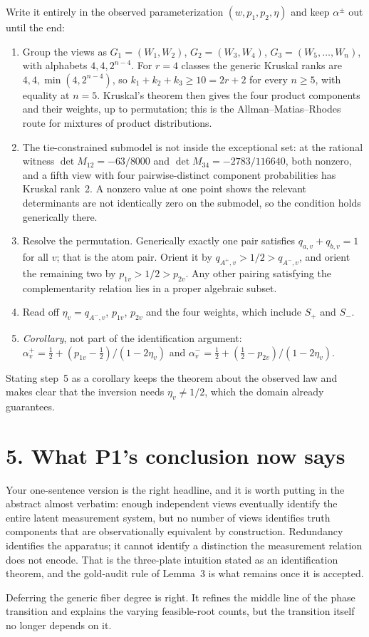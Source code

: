 \documentclass[11pt]{article}
\theoremstyle{remark}
\begin{document}
Write it entirely in the observed parameterization $(w,p_1,p_2,\eta)$ and keep $\alpha^{\pm}$ out until the end:
\begin{enumerate}
\item Group the views as $G_1=(W_1,W_2)$, $G_2=(W_3,W_4)$, $G_3=(W_5,\dots,W_n)$, with alphabets $4,4,2^{n-4}$. For $r=4$ classes the generic Kruskal ranks are $4,4,\min(4,2^{n-4})$, so $k_1+k_2+k_3\ge10=2r+2$ for every $n\ge5$, with equality at $n=5$. Kruskal's theorem then gives the four product components and their weights, up to permutation; this is the Allman--Matias--Rhodes route for mixtures of product distributions.
\item The tie-constrained submodel is not inside the exceptional set: at the rational witness $\det M_{12}=-63/8000$ and $\det M_{34}=-2783/116640$, both nonzero, and a fifth view with four pairwise-distinct component probabilities has Kruskal rank~2. A nonzero value at one point shows the relevant determinants are not identically zero on the submodel, so the condition holds generically there.
\item Resolve the permutation. Generically exactly one pair satisfies $q_{a,v}+q_{b,v}=1$ for all $v$; that is the atom pair. Orient it by $q_{A^+,v}>1/2>q_{A^-,v}$, and orient the remaining two by $p_{1v}>1/2>p_{2v}$. Any other pairing satisfying the complementarity relation lies in a proper algebraic subset.
\item Read off $\eta_v=q_{A^-,v}$, $p_{1v}$, $p_{2v}$ and the four weights, which include $S_+$ and $S_-$.
\item \emph{Corollary}, not part of the identification argument: $\alpha^+_v=\tfrac12+(p_{1v}-\tfrac12)/(1-2\eta_v)$ and $\alpha^-_v=\tfrac12+(\tfrac12-p_{2v})/(1-2\eta_v)$.
\end{enumerate}
Stating step~5 as a corollary keeps the theorem about the observed law and makes clear that the inversion needs $\eta_v\neq1/2$, which the domain already guarantees.

\section*{5. What P1's conclusion now says}

Your one-sentence version is the right headline, and it is worth putting in the abstract almost verbatim: enough independent views eventually identify the entire latent measurement system, but no number of views identifies truth components that are observationally equivalent by construction. Redundancy identifies the apparatus; it cannot identify a distinction the measurement relation does not encode. That is the three-plate intuition stated as an identification theorem, and the gold-audit rule of Lemma~3 is what remains once it is accepted.

Deferring the generic fiber degree is right. It refines the middle line of the phase transition and explains the varying feasible-root counts, but the transition itself no longer depends on it.
\end{document}
